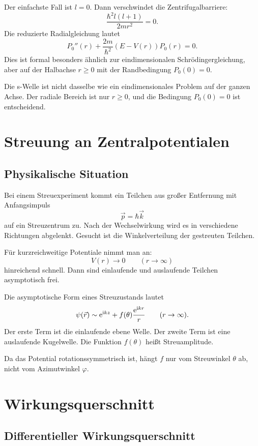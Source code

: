 Der einfachste Fall ist \(l=0\). Dann verschwindet die Zentrifugalbarriere:
\[
    \frac{\hbar^2l(l+1)}{2mr^2}=0.
\]
Die reduzierte Radialgleichung lautet
\[
    P_0''(r)+\frac{2m}{\hbar^2}(E-V(r))P_0(r)=0.
\]
Dies ist formal besonders ähnlich zur eindimensionalen Schrödingergleichung, aber auf der Halbachse \(r\ge 0\) mit der Randbedingung \(P_0(0)=0\).

\begin{warningbox}
Die s-Welle ist nicht dasselbe wie ein eindimensionales Problem auf der ganzen Achse. Der radiale Bereich ist nur \(r\ge 0\), und die Bedingung \(P_0(0)=0\) ist entscheidend.
\end{warningbox}

\section{Streuung an Zentralpotentialen}

\subsection{Physikalische Situation}

Bei einem Streuexperiment kommt ein Teilchen aus großer Entfernung mit Anfangsimpuls
\[
    \vec p=\hbar\vec k
\]
auf ein Streuzentrum zu. Nach der Wechselwirkung wird es in verschiedene Richtungen abgelenkt. Gesucht ist die Winkelverteilung der gestreuten Teilchen.

Für kurzreichweitige Potentiale nimmt man an:
\[
    V(r)\to 0
    \qquad (r\to\infty)
\]
hinreichend schnell. Dann sind einlaufende und auslaufende Teilchen asymptotisch frei.

\begin{definitionbox}
Die asymptotische Form eines Streuzustands lautet
\[
    \psi(\vec r)
    \sim \mathrm{e}^{\mathrm{i} kz}+f(\theta)\frac{\mathrm{e}^{\mathrm{i} kr}}{r}
    \qquad (r\to\infty).
\]
Der erste Term ist die einlaufende ebene Welle. Der zweite Term ist eine auslaufende Kugelwelle. Die Funktion \(f(\theta)\) heißt Streuamplitude.
\end{definitionbox}

Da das Potential rotationssymmetrisch ist, hängt \(f\) nur vom Streuwinkel \(\theta\) ab, nicht vom Azimutwinkel \(\varphi\).

\section{Wirkungsquerschnitt}

\subsection{Differentieller Wirkungsquerschnitt}

